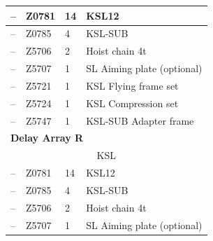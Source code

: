 \begin{longtable}[H]{|llll|}
            \multicolumn{1}{|l|}{--}              & \multicolumn{1}{l|}{Z0781}                  & \multicolumn{1}{l|}{14}             & KSL12                      \\ \hline
            \multicolumn{1}{|l|}{--}              & \multicolumn{1}{l|}{Z0785}                  & \multicolumn{1}{l|}{4}              & KSL-SUB                    \\ \hline
            \multicolumn{1}{|l|}{--}              & \multicolumn{1}{l|}{Z5706}                  & \multicolumn{1}{l|}{2}              & Hoist chain 4t             \\ \hline
            \multicolumn{1}{|l|}{--}              & \multicolumn{1}{l|}{Z5707}                  & \multicolumn{1}{l|}{1}              & SL Aiming plate (optional) \\ \hline
            \multicolumn{1}{|l|}{--}              & \multicolumn{1}{l|}{Z5721}                  & \multicolumn{1}{l|}{1}              & KSL Flying frame set       \\ \hline
            \multicolumn{1}{|l|}{--}              & \multicolumn{1}{l|}{Z5724}                  & \multicolumn{1}{l|}{1}              & KSL Compression set        \\ \hline
            \multicolumn{1}{|l|}{--}              & \multicolumn{1}{l|}{Z5747}                  & \multicolumn{1}{l|}{1}              & KSL-SUB Adapter frame      \\ \hline
            \multicolumn{4}{|l|}{\textbf{Delay Array R}}                                                                                                           \\ \hline
            \multicolumn{4}{|c|}{KSL}                                                                                                                              \\ \hline
            \multicolumn{1}{|l|}{--}              & \multicolumn{1}{l|}{Z0781}                  & \multicolumn{1}{l|}{14}             & KSL12                      \\ \hline
            \multicolumn{1}{|l|}{--}              & \multicolumn{1}{l|}{Z0785}                  & \multicolumn{1}{l|}{4}              & KSL-SUB                    \\ \hline
            \multicolumn{1}{|l|}{--}              & \multicolumn{1}{l|}{Z5706}                  & \multicolumn{1}{l|}{2}              & Hoist chain 4t             \\ \hline
            \multicolumn{1}{|l|}{--}              & \multicolumn{1}{l|}{Z5707}                  & \multicolumn{1}{l|}{1}              & SL Aiming plate (optional) \\ \hline

\end{longtable}
